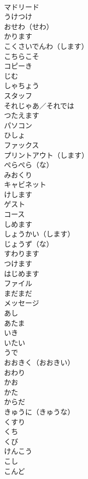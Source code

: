 \documentclass[8pt]{extreport}
\begin{document}
\begin{CJK}{UTF8}{min}
\\	マドリード	
\\	うけつけ	
\\	おせわ（せわ）	
\\	かります	
\\	こくさいでんわ（します）	
\\	こちらこそ	
\\	コピーき	
\\	じむ	
\\	しゃちょう	
\\	スタッフ	
\\	それじゃあ／それでは	
\\	つたえます	
\\	パソコン	
\\	ひしょ	
\\	ファックス	
\\	プリントアウト（します）	
\\	ぺらぺら（な）	
\\	みおくり	
\\	キャビネット	
\\	けします	
\\	ゲスト	
\\	コース	
\\	しめます	
\\	しょうかい（します）	
\\	じょうず（な）	
\\	すわります	
\\	つけます	
\\	はじめます	
\\	ファイル	
\\	まだまだ	
\\	メッセージ	
\\	あし	
\\	あたま	
\\	いき	
\\	いたい	
\\	うで	
\\	おおきく（おおきい）	
\\	おわり	
\\	かお	
\\	かた	
\\	からだ	
\\	きゅうに（きゅうな）	
\\	くすり	
\\	くち	
\\	くび	
\\	けんこう	
\\	こし	
\\	こんど	

\end{CJK}
\end{document}
